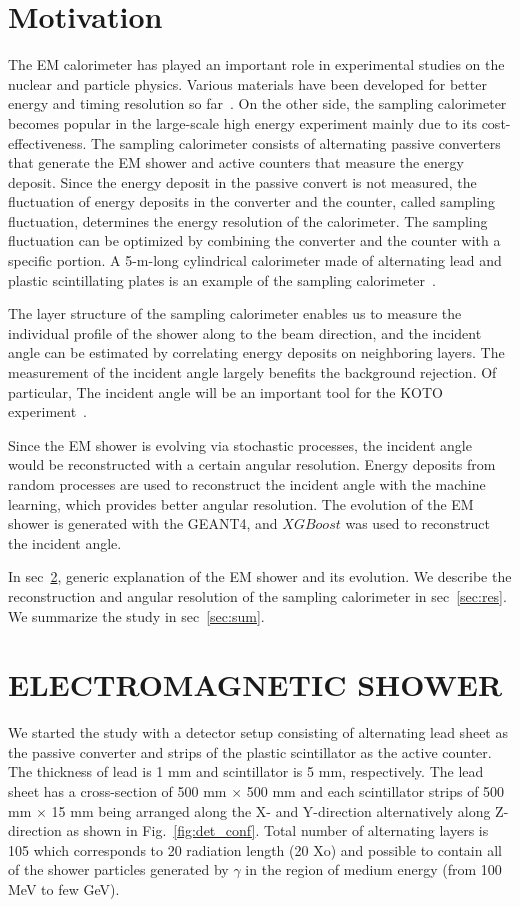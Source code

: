\documentclass[jkps,preprint,fleqn,showpacs,showkeys]{revtex4}
\newcommand{\XGB}{XGBoost}
\begin{document}
\section{Motivation}
\label{sec:mot}
The EM calorimeter has played an important role in experimental studies on the nuclear and particle physics. Various materials have been developed for better energy and timing resolution so far~\cite{Calorimeter}. On the other side, the sampling calorimeter becomes popular in the large-scale high energy experiment mainly due to its cost-effectiveness. The sampling calorimeter consists of alternating passive converters that generate the EM shower and active counters that measure the energy deposit. Since the energy deposit in the passive convert is not measured, the fluctuation of energy deposits in the converter and the counter, called sampling fluctuation, determines the energy resolution of the calorimeter. The sampling fluctuation can be optimized by combining the converter and the counter with a specific portion. A 5-m-long cylindrical calorimeter made of alternating lead and plastic scintillating plates is an example of the sampling calorimeter~\cite{E391a_barrel}.

The layer structure of the sampling calorimeter enables us to measure the individual profile of the shower along to the beam direction, and the incident angle can be estimated by correlating energy deposits on neighboring layers. The measurement of the incident angle largely benefits the background rejection. Of particular, The incident angle will be an important tool for the KOTO experiment~\cite{KOTOproposal}.

Since the EM shower is evolving via stochastic processes, the incident angle would be reconstructed with a certain angular resolution. Energy deposits from random processes are used to reconstruct the incident angle with the machine learning, which provides better angular resolution. The evolution of the EM shower is generated with the GEANT4, and $\XGB$ was used to reconstruct the incident angle.

In sec~\ref{sec:ems}, generic explanation of the EM shower and its evolution. We describe the reconstruction and angular resolution of the sampling calorimeter in sec~\ref{sec:res}. We summarize the study in sec~\ref{sec:sum}.

\section{ELECTROMAGNETIC SHOWER}
\label{sec:ems}
We started the study with a detector setup consisting of alternating lead sheet as the passive converter and strips of the plastic scintillator as the active counter. The thickness of lead is 1 mm and scintillator is 5 mm, respectively. The lead sheet has a cross-section of  500 mm $\times$ 500 mm and each scintillator strips of 500 mm $\times$ 15 mm  being arranged along the X- and Y-direction alternatively along Z-direction as shown in  Fig.~\ref{fig:det_conf}. Total number of alternating layers is 105 which corresponds to 20 radiation length (20 Xo) and possible to contain all of the shower particles generated by $\gamma$ in the region of medium energy (from  100 MeV to few GeV). 
 
\end{document}
